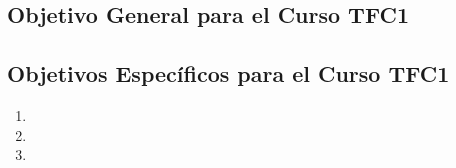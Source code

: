 \subsection{Objetivo General para el Curso TFC1}

\lipsum[27-27]

\subsection{Objetivos Específicos para el Curso TFC1}

\begin{enumerate}
	\setlength\itemsep{-0.5em}
	\item 
	\item 
	\item 
\end{enumerate}